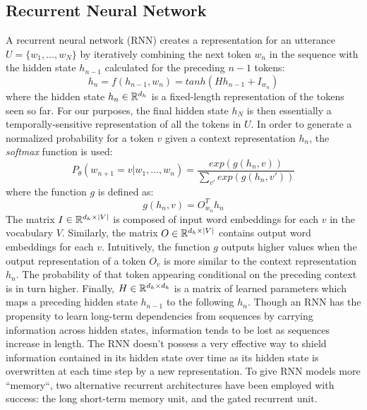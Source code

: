\documentclass[11pt]{article}
\begin{document}
\subsection{Recurrent Neural Network}

A recurrent neural network (RNN) creates a representation for an utterance $U = \{w_{1}, \dots, w_{N}\}$ by iteratively combining the next token $w_{n}$ in the sequence with the hidden state $h_{n-1}$ calculated for the preceding $n-1$ tokens: $$h_{n}=f(h_{n-1}, w_{n})=tanh(Hh_{n-1}+I_{w_{n}})$$ where the hidden state $h_{n} \in \mathbb{R}^{d_{h}}$ is a fixed-length representation of the tokens seen so far. For our purposes, the final hidden state $h_{N}$ is then essentially a temporally-sensitive representation of all the tokens in $U$. In order to generate a normalized probability for a token $v$ given a context representation $h_{n}$, the {\it softmax} function is used: $$P_\theta(w_{n+1}=v|w_{1}, \dots, w_{n})=\frac{exp(g(h_{n},v))}{\sum_{v'} exp(g(h_{n},v'))}$$ where the function $g$ is defined as: $$g(h_{n},v)=O_{w_{n}}^{T}h_{n}$$ The matrix $I \in \mathbb{R}^{d_{h} \times |V|}$ is composed of input word embeddings for each $v$ in the vocabulary $V$. Similarly, the matrix $O \in \mathbb{R}^{d_{h} \times |V|}$ contains output word embeddings for each $v$. Intuitively, the function $g$ outputs higher values when the output representation of a token $O_{v}$ is more similar to the context representation $h_{n}$. The probability of that token appearing conditional on the preceding context is in turn higher. Finally, $H \in \mathbb{R}^{d_{h} \times d_{h}}$ is a matrix of learned parameters which maps a preceding hidden state $h_{n-1}$ to the following $h_{n}$. Though an RNN has the propensity to learn long-term dependencies from sequences by carrying information across hidden states, information tends to be lost as sequences increase in length. The RNN doesn't possess a very effective way to shield information contained in its hidden state over time as its hidden state is overwritten at each time step by a new representation. To give RNN models more ``memory``, two alternative recurrent architectures have been employed with success: the long short-term memory unit, and the gated recurrent unit.
\end{document}
